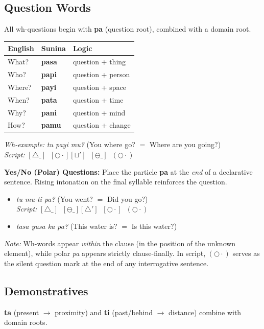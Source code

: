 \documentclass[12pt, a4paper]{article}
\begin{document}
\subsection{Question Words}
All wh-questions begin with \textbf{pa} (question root), combined with a domain root.

\vspace{0.5em}
\begin{tabular}{@{}lll@{}}
\toprule
\textbf{English} & \textbf{Sunina} & \textbf{Logic} \\ \midrule
What? & \textbf{pasa} & question + thing \\
Who? & \textbf{papi} & question + person \\
Where? & \textbf{payi} & question + space \\
When? & \textbf{pata} & question + time \\
Why? & \textbf{pani} & question + mind \\
How? & \textbf{pamu} & question + change \\
\bottomrule
\end{tabular}

\vspace{0.5em}
\noindent\textit{Wh-example:} \textit{tu payi mu?} \quad (You where go? $=$ Where are you going?) \\
\textit{Script:} $[\triangle\_] \;\; [\bigcirc\cdot][\sqcup'] \;\; [\ominus\_] \;\; (\bigcirc\cdot)$

\noindent\textbf{Yes/No (Polar) Questions:} Place the particle \textbf{pa} at the \textit{end} of a declarative sentence. Rising intonation on the final syllable reinforces the question.
\begin{itemize}
    \item \textit{tu mu-ti pa?} \quad (You went? $=$ Did you go?) \\
    \textit{Script:} $[\triangle\_] \;\; [\ominus\_][\triangle'] \;\; [\bigcirc\cdot] \;\; (\bigcirc\cdot)$
    \item \textit{tasa yusa ka pa?} \quad (This water is? $=$ Is this water?)
\end{itemize}
\textit{Note:} Wh-words appear \textit{within} the clause (in the position of the unknown element), while polar \textit{pa} appears strictly clause-finally. In script, $(\bigcirc\cdot)$ serves as the silent question mark at the end of any interrogative sentence.

\subsection{Demonstratives}
\textbf{ta} (present $\rightarrow$ proximity) and \textbf{ti} (past/behind $\rightarrow$ distance) combine with domain roots.
\end{document}
